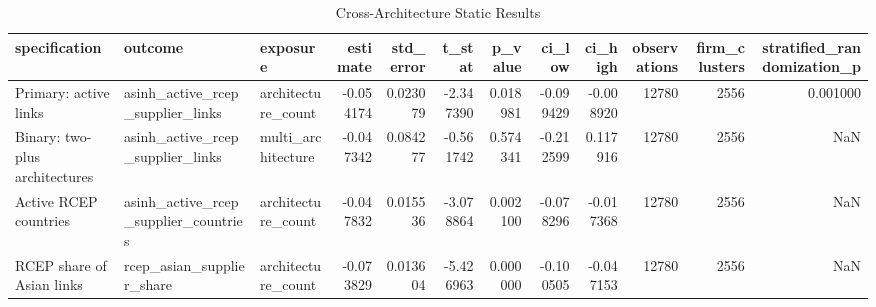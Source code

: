 \begin{table}
\caption{Cross-Architecture Static Results}
\label{tab:table2_static_results}
\begin{tabular}{lllrrrrrrrrr}
\toprule
specification & outcome & exposure & estimate & std_error & t_stat & p_value & ci_low & ci_high & observations & firm_clusters & stratified_randomization_p \\
\midrule
Primary: active links & asinh_active_rcep_supplier_links & architecture_count & -0.054174 & 0.023079 & -2.347390 & 0.018981 & -0.099429 & -0.008920 & 12780 & 2556 & 0.001000 \\
Binary: two-plus architectures & asinh_active_rcep_supplier_links & multi_architecture & -0.047342 & 0.084277 & -0.561742 & 0.574341 & -0.212599 & 0.117916 & 12780 & 2556 & NaN \\
Active RCEP countries & asinh_active_rcep_supplier_countries & architecture_count & -0.047832 & 0.015536 & -3.078864 & 0.002100 & -0.078296 & -0.017368 & 12780 & 2556 & NaN \\
RCEP share of Asian links & rcep_asian_supplier_share & architecture_count & -0.073829 & 0.013604 & -5.426963 & 0.000000 & -0.100505 & -0.047153 & 12780 & 2556 & NaN \\
\bottomrule
\end{tabular}
\end{table}
